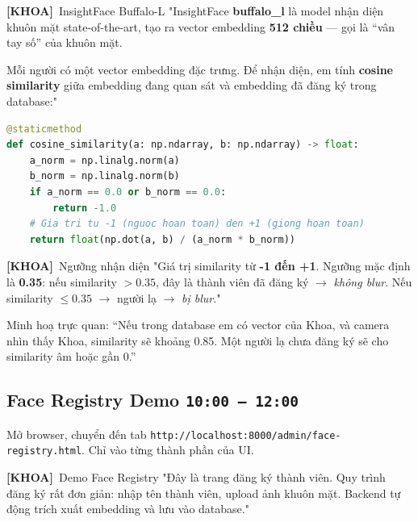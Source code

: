 \documentclass[12pt, a4paper]{article}
\newcommand{\timing}[1]{%
  \hfill\colorbox{NavyBlue!20}{\texttt{\small #1}}%
}
\newcommand{\khoa}{\textcolor{OliveGreen}{\textbf{[KHOA]}}}
\begin{document}
\begin{dialog}{\khoa\ InsightFace Buffalo-L}
"InsightFace \textbf{buffalo\_l} là model nhận diện khuôn mặt state-of-the-art,
tạo ra vector embedding \textbf{512 chiều} --- gọi là ``vân tay số'' của khuôn mặt.

Mỗi người có một vector embedding đặc trưng.
Để nhận diện, em tính \textbf{cosine similarity} giữa embedding đang quan sát
và embedding đã đăng ký trong database:"
\end{dialog}

\begin{lstlisting}[language=Python, caption={src/face\_recognition.py --- Cosine Similarity}]
@staticmethod
def cosine_similarity(a: np.ndarray, b: np.ndarray) -> float:
    a_norm = np.linalg.norm(a)
    b_norm = np.linalg.norm(b)
    if a_norm == 0.0 or b_norm == 0.0:
        return -1.0
    # Gia tri tu -1 (nguoc hoan toan) den +1 (giong hoan toan)
    return float(np.dot(a, b) / (a_norm * b_norm))
\end{lstlisting}

\begin{dialog}{\khoa\ Ngưỡng nhận diện}
"Giá trị similarity từ \textbf{-1 đến +1}.
Ngưỡng mặc định là \textbf{0.35}: nếu similarity $> 0.35$,
đây là thành viên đã đăng ký $\rightarrow$ \textit{không blur}.
Nếu similarity $\leq 0.35$ $\rightarrow$ người lạ $\rightarrow$ \textit{bị blur}."
\end{dialog}

\begin{note}
Minh hoạ trực quan: ``Nếu trong database em có vector của Khoa,
và camera nhìn thấy Khoa, similarity sẽ khoảng 0.85.
Một người lạ chưa đăng ký sẽ cho similarity âm hoặc gần 0.''
\end{note}

\subsection{Face Registry Demo \timing{10:00 – 12:00}}

\begin{action}
Mở browser, chuyển đến tab \texttt{http://localhost:8000/admin/face-registry.html}.
Chỉ vào từng thành phần của UI.
\end{action}

\begin{dialog}{\khoa\ Demo Face Registry}
"Đây là trang đăng ký thành viên.
Quy trình đăng ký rất đơn giản:
nhập tên thành viên, upload ảnh khuôn mặt.
Backend tự động trích xuất embedding và lưu vào database."
\end{dialog}
\end{document}
